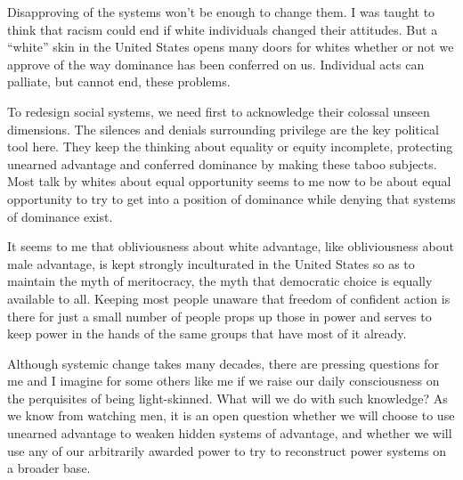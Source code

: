 \documentclass{article}
\begin{document}
Disapproving of the systems won't be enough to change them. I was taught to
think that racism could end if white individuals changed their attitudes. But a
``white'' skin in the United States opens many doors for whites whether or not
we approve of the way dominance has been conferred on us. Individual acts can
palliate, but cannot end, these problems.

To redesign social systems, we need first to acknowledge their colossal unseen
dimensions. The silences and denials surrounding privilege are the key
political tool here. They keep the thinking about equality or equity
incomplete, protecting unearned advantage and conferred dominance by making
these taboo subjects. Most talk by whites about equal opportunity seems to me
now to be about equal opportunity to try to get into a position of dominance
while denying that systems of dominance exist.

It seems to me that obliviousness about white advantage, like obliviousness
about male advantage, is kept strongly inculturated in the United States so as
to maintain the myth of meritocracy, the myth that democratic choice is equally
available to all. Keeping most people unaware that freedom of confident action
is there for just a small number of people props up those in power and serves
to keep power in the hands of the same groups that have most of it already.

Although systemic change takes many decades, there are pressing questions for
me and I imagine for some others like me if we raise our daily consciousness on
the perquisites of being light-skinned. What will we do with such knowledge? As
we know from watching men, it is an open question whether we will choose to use
unearned advantage to weaken hidden systems of advantage, and whether we will
use any of our arbitrarily awarded power to try to reconstruct power systems on
a broader base.
\end{document}
